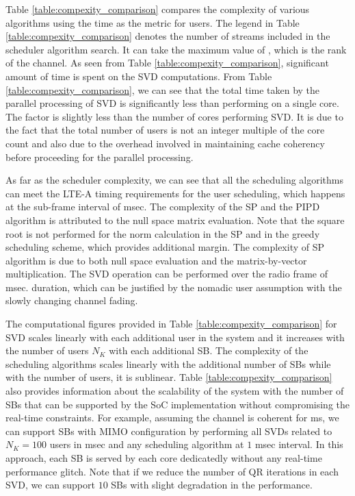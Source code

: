 \documentclass[conference,letterpaper]{./../../IEEE/IEEEtran}
\begin{document}
Table \ref{table:compexity_comparison} compares the complexity of various algorithms using the time as the metric for  users. The legend \me{\lambda} in Table \ref{table:compexity_comparison} denotes the number of streams included in the scheduler algorithm search. It can take the maximum value of \me{\kappa}, which is the rank of the channel. As seen from Table \ref{table:compexity_comparison}, significant amount of time is spent on the SVD computations. From Table \ref{table:compexity_comparison}, we can see that the total time taken by the parallel processing of SVD is significantly less than performing on a single core. The factor is slightly less than the number of cores performing SVD. It is due to the fact that the total number of users is not an integer multiple of the core count and also due to the overhead involved in maintaining cache coherency before proceeding for the parallel processing.

As far as the scheduler complexity, we can see that all the scheduling algorithms can meet the LTE-A timing requirements for the user scheduling, which happens at the sub-frame interval of  msec. The complexity of the SP and the PIPD algorithm is attributed to the null space matrix evaluation. Note that the square root is not performed for the norm calculation in the SP and in the greedy scheduling scheme, which provides additional margin. The complexity of SP algorithm is due to both null space evaluation and the matrix-by-vector multiplication. The SVD operation can be performed over the radio frame of  msec. duration, which can be justified by the nomadic user assumption with the slowly changing channel fading.

The computational figures provided in Table \ref{table:compexity_comparison} for SVD scales linearly with each additional user in the system and it increases with the number of users $N_K$ with each additional SB. The complexity of the scheduling algorithms scales linearly with the additional number of SBs while with the number of users, it is sublinear. Table \ref{table:compexity_comparison} also provides information about the scalability of the system with the number of SBs that can be supported by the \ac{SoC} implementation without compromising the real-time constraints. For example, assuming the channel is coherent for  ms, we can support  SBs with  MIMO configuration by performing all SVDs related to $N_K = 100$ users in  msec and any scheduling algorithm at $1$ msec interval. In this approach, each SB is served by each core dedicatedly without any real-time performance glitch. Note that if we reduce the number of QR iterations in each SVD, we can support $10$ SBs with slight degradation in the performance.
\end{document}
